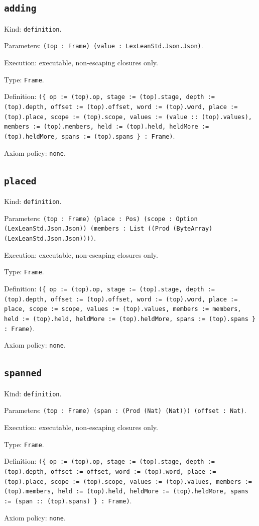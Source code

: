 \documentclass[11pt]{article}
\begin{document}
\subsection*{\texttt{adding}}
\noindent Kind: \texttt{definition}.\par
\noindent Parameters: \texttt{(top : Frame) (value : LexLeanStd.Json.Json)}.\par
\noindent Execution: executable, non-escaping closures only.\par
\noindent Type: \texttt{Frame}.\par
\noindent Definition: \texttt{(\{ op := (top).op, stage := (top).stage, depth := (top).depth, offset := (top).offset, word := (top).word, place := (top).place, scope := (top).scope, values := (value :: (top).values), members := (top).members, held := (top).held, heldMore := (top).heldMore, spans := (top).spans \} : Frame)}.\par
\noindent Axiom policy: \texttt{none}.\par
\subsection*{\texttt{placed}}
\noindent Kind: \texttt{definition}.\par
\noindent Parameters: \texttt{(top : Frame) (place : Pos) (scope : Option (LexLeanStd.Json.Json)) (members : List ((Prod (ByteArray) (LexLeanStd.Json.Json))))}.\par
\noindent Execution: executable, non-escaping closures only.\par
\noindent Type: \texttt{Frame}.\par
\noindent Definition: \texttt{(\{ op := (top).op, stage := (top).stage, depth := (top).depth, offset := (top).offset, word := (top).word, place := place, scope := scope, values := (top).values, members := members, held := (top).held, heldMore := (top).heldMore, spans := (top).spans \} : Frame)}.\par
\noindent Axiom policy: \texttt{none}.\par
\subsection*{\texttt{spanned}}
\noindent Kind: \texttt{definition}.\par
\noindent Parameters: \texttt{(top : Frame) (span : (Prod (Nat) (Nat))) (offset : Nat)}.\par
\noindent Execution: executable, non-escaping closures only.\par
\noindent Type: \texttt{Frame}.\par
\noindent Definition: \texttt{(\{ op := (top).op, stage := (top).stage, depth := (top).depth, offset := offset, word := (top).word, place := (top).place, scope := (top).scope, values := (top).values, members := (top).members, held := (top).held, heldMore := (top).heldMore, spans := (span :: (top).spans) \} : Frame)}.\par
\noindent Axiom policy: \texttt{none}.\par
\end{document}
